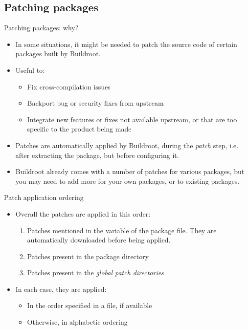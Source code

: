 \subsection{Patching packages}

\begin{frame}{Patching packages: why?}
  \begin{itemize}
  \item In some situations, it might be needed to patch the source
    code of certain packages built by Buildroot.
  \item Useful to:
    \begin{itemize}
    \item Fix cross-compilation issues
    \item Backport bug or security fixes from upstream
    \item Integrate new features or fixes not available upstream, or
      that are too specific to the product being made
    \end{itemize}
  \item Patches are automatically applied by Buildroot, during the
    {\em patch} step, i.e. after extracting the package, but before
    configuring it.
  \item Buildroot already comes with a number of patches for various
    packages, but you may need to add more for your own packages, or
    to existing packages.
  \end{itemize}
\end{frame}

\begin{frame}{Patch application ordering}
  \begin{itemize}
  \item Overall the patches are applied in this order:
    \begin{enumerate}
    \item Patches mentioned in the  variable of the
      package  file. They are automatically downloaded
      before being applied.
    \item Patches present in the package directory
    \item Patches present in the {\em global patch directories}
    \end{enumerate}
  \item In each case, they are applied:
    \begin{itemize}
    \item In the order specified in a  file, if available
    \item Otherwise, in alphabetic ordering
    \end{itemize}
  \end{itemize}
\end{frame}

